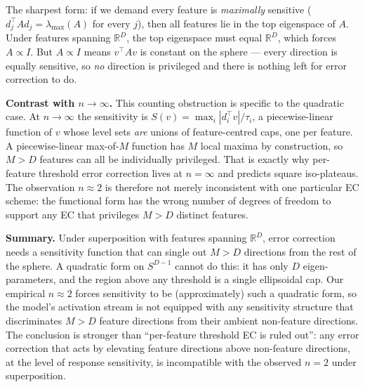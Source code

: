 \documentclass[11pt]{article}
\begin{document}
The sharpest form: if we demand every feature is \emph{maximally} sensitive ($d_j^\top A d_j = \lambda_{\max}(A)$ for every $j$), then all features lie in the top eigenspace of $A$. Under features spanning $\mathbb{R}^D$, the top eigenspace must equal $\mathbb{R}^D$, which forces $A \propto I$. But $A \propto I$ means $v^\top A v$ is constant on the sphere --- every direction is equally sensitive, so \emph{no} direction is privileged and there is nothing left for error correction to do.

\medskip
\noindent\textbf{Contrast with $n \to \infty$.} This counting obstruction is specific to the quadratic case. At $n \to \infty$ the sensitivity is $S(v) = \max_i |d_i^\top v|/\tau_i$, a piecewise-linear function of $v$ whose level sets \emph{are} unions of feature-centred caps, one per feature. A piecewise-linear max-of-$M$ function has $M$ local maxima by construction, so $M > D$ features can all be individually privileged. That is exactly why per-feature threshold error correction lives at $n = \infty$ and predicts square iso-plateaus. The observation $n \approx 2$ is therefore not merely inconsistent with one particular EC scheme: the functional form has the wrong number of degrees of freedom to support any EC that privileges $M > D$ distinct features.

\medskip
\noindent\textbf{Summary.} Under superposition with features spanning $\mathbb{R}^D$, error correction needs a sensitivity function that can single out $M > D$ directions from the rest of the sphere. A quadratic form on $S^{D-1}$ cannot do this: it has only $D$ eigen-parameters, and the region above any threshold is a single ellipsoidal cap. Our empirical $n \approx 2$ forces sensitivity to be (approximately) such a quadratic form, so the model's activation stream is not equipped with any sensitivity structure that discriminates $M > D$ feature directions from their ambient non-feature directions. The conclusion is stronger than ``per-feature threshold EC is ruled out'': any error correction that acts by elevating feature directions above non-feature directions, at the level of response sensitivity, is incompatible with the observed $n = 2$ under superposition.
\end{document}
